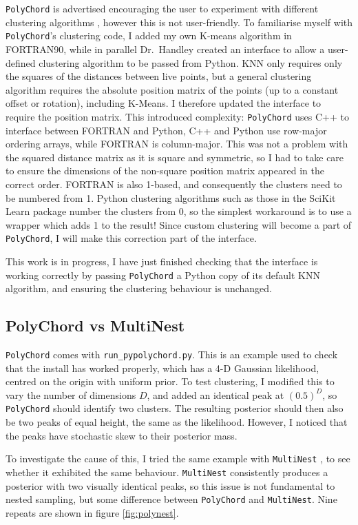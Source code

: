 \documentclass{article}
\begin{document}
\texttt{PolyChord} is advertised encouraging the user to experiment with different clustering algorithms \cite{PolyChord_1, PolyChord_2}, however this is not user-friendly. To familiarise myself with \texttt{PolyChord}'s clustering code, I added my own K-means algorithm in FORTRAN90, while in parallel Dr.~Handley created an interface to allow a user-defined clustering algorithm to be passed from Python. KNN only requires only the squares of the distances between live points, but a general clustering algorithm requires the absolute position matrix of the points (up to a constant offset or rotation), including K-Means. I therefore updated the interface to require the position matrix. This introduced complexity: \texttt{PolyChord} uses C++ to interface between FORTRAN and Python, C++ and Python use row-major ordering arrays, while FORTRAN is column-major. This was not a problem with the squared distance matrix as it is square and symmetric, so I had to take care to ensure the dimensions of the non-square position matrix appeared in the correct order. FORTRAN is also 1-based, and consequently the clusters need to be numbered from 1. Python clustering algorithms such as those in the SciKit Learn package number the clusters from 0, so the simplest workaround is to use a wrapper which adds 1 to the result! Since custom clustering will become a part of \texttt{PolyChord}, I will make this correction part of the interface.

This work is in progress, I have just finished checking that the interface is working correctly by passing \texttt{PolyChord} a Python copy of its default KNN algorithm, and ensuring the clustering behaviour is unchanged. 

\subsection{PolyChord vs MultiNest}
 
\texttt{PolyChord} comes with \texttt{run\_pypolychord.py}. This is an example used to check that the install has worked properly, which has a 4-D Gaussian likelihood, centred on the origin with uniform prior. To test clustering, I modified this to vary the number of dimensions $D$, and added an identical peak at $(0.5)^D$, so \texttt{PolyChord} should identify two clusters. The resulting posterior should then also be two peaks of equal height, the same as the likelihood. However, I noticed that the peaks have stochastic skew to their posterior mass.

To investigate the cause of this, I tried the same example with \texttt{MultiNest} \cite{MultiNest}, to see whether it exhibited the same behaviour. \texttt{MultiNest} consistently produces a posterior with two visually identical peaks, so this issue is not fundamental to nested sampling, but some difference between \texttt{PolyChord} and \texttt{MultiNest}. Nine repeats are shown in figure \ref{fig:polynest}.
\end{document}

